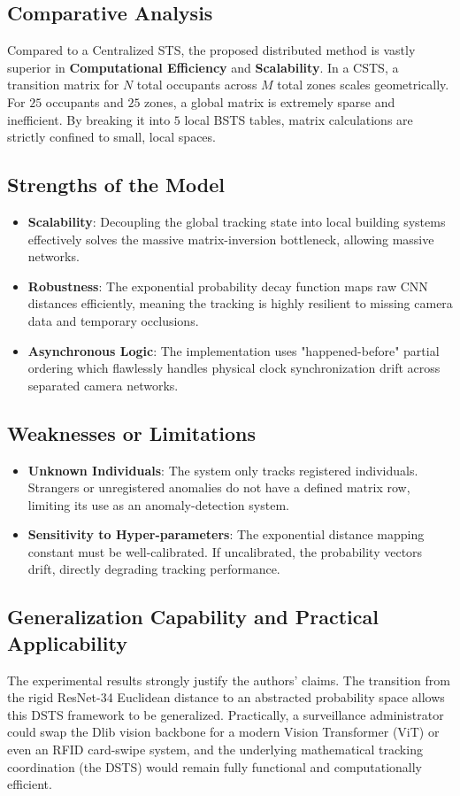 \documentclass[12pt,a4paper]{article}
\begin{document}
\subsection{Comparative Analysis}
Compared to a Centralized STS, the proposed distributed method is vastly superior in \textbf{Computational Efficiency} and \textbf{Scalability}. In a CSTS, a transition matrix for $N$ total occupants across $M$ total zones scales geometrically. For $25$ occupants and $25$ zones, a global matrix is extremely sparse and inefficient. By breaking it into $5$ local BSTS tables, matrix calculations are strictly confined to small, local spaces.

\subsection{Strengths of the Model}
\begin{itemize}
    \item \textbf{Scalability}: Decoupling the global tracking state into local building systems effectively solves the massive matrix-inversion bottleneck, allowing massive networks.
    \item \textbf{Robustness}: The exponential probability decay function maps raw CNN distances efficiently, meaning the tracking is highly resilient to missing camera data and temporary occlusions. 
    \item \textbf{Asynchronous Logic}: The implementation uses "happened-before" partial ordering which flawlessly handles physical clock synchronization drift across separated camera networks.
\end{itemize}

\subsection{Weaknesses or Limitations}
\begin{itemize}
    \item \textbf{Unknown Individuals}: The system only tracks registered individuals. Strangers or unregistered anomalies do not have a defined matrix row, limiting its use as an anomaly-detection system.
    \item \textbf{Sensitivity to Hyper-parameters}: The exponential distance mapping constant must be well-calibrated. If uncalibrated, the probability vectors drift, directly degrading tracking performance.
\end{itemize}

\subsection{Generalization Capability and Practical Applicability}
The experimental results strongly justify the authors' claims. The transition from the rigid ResNet-34 Euclidean distance to an abstracted probability space allows this DSTS framework to be generalized. Practically, a surveillance administrator could swap the Dlib vision backbone for a modern Vision Transformer (ViT) or even an RFID card-swipe system, and the underlying mathematical tracking coordination (the DSTS) would remain fully functional and computationally efficient.
\end{document}
